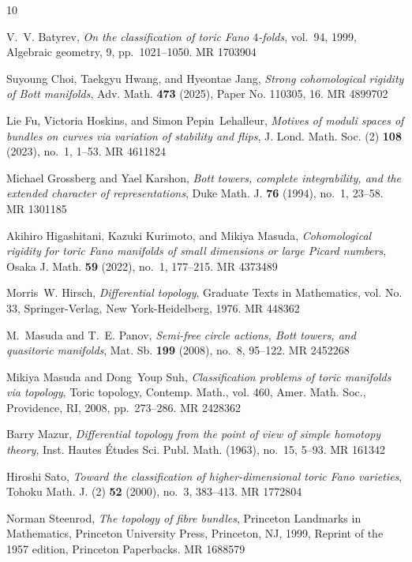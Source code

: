 \documentclass{amsart}
\numberwithin{equation}{section}
\theoremstyle{definition}
\begin{document}
\providecommand{\bysame}{\leavevmode\hbox to3em{\hrulefill}\thinspace}
\providecommand{\MR}{\relax\ifhmode\unskip\space\fi MR }
\providecommand{\MRhref}[2]{%
  \href{http://www.ams.org/mathscinet-getitem?mr=#1}{#2}
}
\providecommand{\href}[2]{#2}
\begin{thebibliography}{10}

V.~V. Batyrev, \emph{On the classification of toric {F}ano {$4$}-folds},
  vol.~94, 1999, Algebraic geometry, 9, pp.~1021--1050. \MR{1703904}

Suyoung Choi, Taekgyu Hwang, and Hyeontae Jang, \emph{Strong cohomological
  rigidity of {B}ott manifolds}, Adv. Math. \textbf{473} (2025), Paper No.
  110305, 16. \MR{4899702}

Lie Fu, Victoria Hoskins, and Simon Pepin~Lehalleur, \emph{Motives of moduli
  spaces of bundles on curves via variation of stability and flips}, J. Lond.
  Math. Soc. (2) \textbf{108} (2023), no.~1, 1--53. \MR{4611824}

Michael Grossberg and Yael Karshon, \emph{Bott towers, complete integrability,
  and the extended character of representations}, Duke Math. J. \textbf{76}
  (1994), no.~1, 23--58. \MR{1301185}

Akihiro Higashitani, Kazuki Kurimoto, and Mikiya Masuda, \emph{Cohomological
  rigidity for toric {F}ano manifolds of small dimensions or large {P}icard
  numbers}, Osaka J. Math. \textbf{59} (2022), no.~1, 177--215. \MR{4373489}

Morris~W. Hirsch, \emph{Differential topology}, Graduate Texts in Mathematics,
  vol. No. 33, Springer-Verlag, New York-Heidelberg, 1976. \MR{448362}

M.~Masuda and T.~E. Panov, \emph{Semi-free circle actions, {B}ott towers, and
  quasitoric manifolds}, Mat. Sb. \textbf{199} (2008), no.~8, 95--122.
  \MR{2452268}

Mikiya Masuda and Dong~Youp Suh, \emph{Classification problems of toric
  manifolds via topology}, Toric topology, Contemp. Math., vol. 460, Amer.
  Math. Soc., Providence, RI, 2008, pp.~273--286. \MR{2428362}

Barry Mazur, \emph{Differential topology from the point of view of simple
  homotopy theory}, Inst. Hautes \'Etudes Sci. Publ. Math. (1963), no.~15,
  5--93. \MR{161342}

Hiroshi Sato, \emph{Toward the classification of higher-dimensional toric
  {F}ano varieties}, Tohoku Math. J. (2) \textbf{52} (2000), no.~3, 383--413.
  \MR{1772804}

Norman Steenrod, \emph{The topology of fibre bundles}, Princeton Landmarks in
  Mathematics, Princeton University Press, Princeton, NJ, 1999, Reprint of the
  1957 edition, Princeton Paperbacks. \MR{1688579}

\end{thebibliography}
\end{document}
